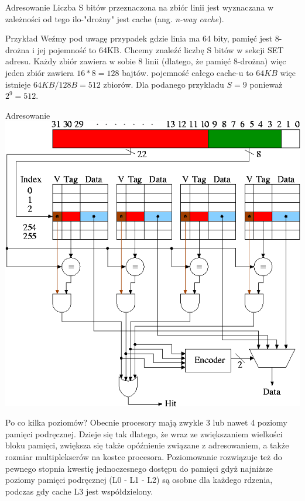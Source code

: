 \documentclass{beamer}
\begin{document}
\begin{frame}{Adresowanie}
Liczba S bitów przeznaczona na zbiór linii jest wyznaczana w zależności od tego ilo-"drożny" jest cache (ang. \emph{n-way cache}).
\begin{exampleblock}{Przykład}
Weźmy pod uwagę przypadek gdzie linia ma 64 bity, pamięć jest 8-drożna i jej pojemność to 64KB. Chcemy znaleźć liczbę S bitów w sekcji SET adresu. Każdy zbiór zawiera w sobie 8 linii (dlatego, że pamięć 8-drożna) więc jeden zbiór zawiera $16*8=128$ bajtów. pojemność całego cache-u to $64KB$ więc istnieje $64KB/128B = 512$ zbiorów. Dla podanego przykładu $S = 9$ ponieważ $2^9 = 512$.
\end{exampleblock}
\end{frame}

\begin{frame}{Adresowanie}
    \centering
    \includegraphics[scale=0.3]{assets/cache_4way.png}
\end{frame}

\begin{frame}{Po co kilka poziomów?}
Obecnie procesory mają zwykle 3 lub nawet 4 poziomy pamięci podręcznej. Dzieje się tak dlatego, że wraz ze zwiększaniem wielkości bloku pamięci, zwiększa się także opóźnienie związane z adresowaniem, a także rozmiar multiplekserów na kostce procesora. Poziomowanie rozwiązuje też do pewnego stopnia kwestię jednoczesnego dostępu do pamięci gdyż najniższe poziomy pamięci podręcznej (L0 - L1 - L2) są osobne dla każdego rdzenia, podczas gdy cache L3 jest współdzielony.
\end{frame}
\end{document}
